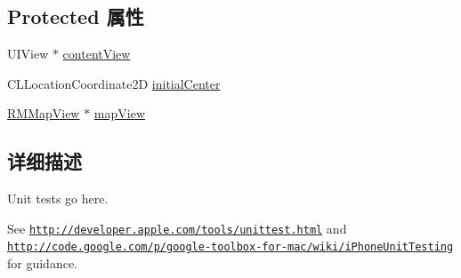 \subsection*{Protected 属性}
\begin{DoxyCompactItemize}
\item 
U\-I\-View $\ast$ \hyperlink{interface_route_me_tests_af79b0357efa051e980aa094ff935cc0c}{content\-View}
\item 
C\-L\-Location\-Coordinate2\-D \hyperlink{interface_route_me_tests_afd6582fc109189f791a6e29542e3bd7e}{initial\-Center}
\item 
\hyperlink{interface_r_m_map_view}{R\-M\-Map\-View} $\ast$ \hyperlink{interface_route_me_tests_a8a362e3d55f79013610baefd998921df}{map\-View}
\end{DoxyCompactItemize}


\subsection{详细描述}
Unit tests go here. 

See \href{http://developer.apple.com/tools/unittest.html}{\tt http\-://developer.\-apple.\-com/tools/unittest.\-html} and \href{http://code.google.com/p/google-toolbox-for-mac/wiki/iPhoneUnitTesting}{\tt http\-://code.\-google.\-com/p/google-\/toolbox-\/for-\/mac/wiki/i\-Phone\-Unit\-Testing} for guidance. 

